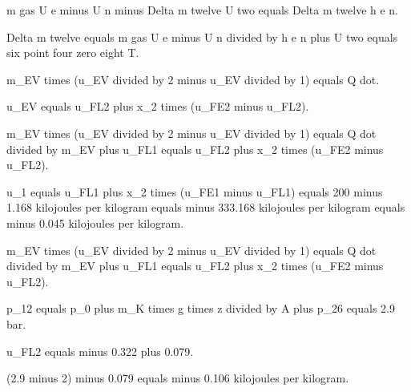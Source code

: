 m gas U e minus U n minus Delta m twelve U two equals Delta m twelve h e n.

Delta m twelve equals m gas U e minus U n divided by h e n plus U two equals six point four zero eight T.

m_EV times (u_EV divided by 2 minus u_EV divided by 1) equals Q dot.

u_EV equals u_FL2 plus x_2 times (u_FE2 minus u_FL2).

m_EV times (u_EV divided by 2 minus u_EV divided by 1) equals Q dot divided by m_EV plus u_FL1 equals u_FL2 plus x_2 times (u_FE2 minus u_FL2).

u_1 equals u_FL1 plus x_2 times (u_FE1 minus u_FL1) equals 200 minus 1.168 kilojoules per kilogram equals minus 333.168 kilojoules per kilogram equals minus 0.045 kilojoules per kilogram.

m_EV times (u_EV divided by 2 minus u_EV divided by 1) equals Q dot divided by m_EV plus u_FL1 equals u_FL2 plus x_2 times (u_FE2 minus u_FL2).

p_12 equals p_0 plus m_K times g times z divided by A plus p_26 equals 2.9 bar.

u_FL2 equals minus 0.322 plus 0.079.

(2.9 minus 2) minus 0.079 equals minus 0.106 kilojoules per kilogram.
